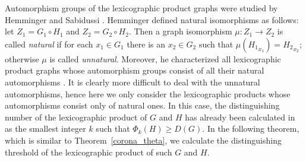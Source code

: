 \documentclass[12pt,a4paper, longbibliography]{article}
\theoremstyle{definition}
\numberwithin{equation}{section}
\begin{document}
	
	Automorphism groups of the lexicographic product graphs were studied by Hemminger \cite{heminger1968} and Sabidussi \cite{Sabidussi1961}.  Hemminger defined natural isomorphisms as follows: let $Z_1 = G_1 \circ H_1$ and $Z_2 =G_2 \circ H_2$. Then a graph isomorphism $\mu: Z_1\rightarrow Z_2$ is called \emph{natural} if for each $x_1 \in G_1$ there is an $x_2 \in G_2$ such that $\mu({H_1}_{x_1})= {H_2}_{x_2}$; otherwise $\mu$ is called \textit{unnatural}. Moreover, he characterized all lexicographic product graphs whose automorphism groups consist  of all their natural automorphisms \cite{heminger1968}. It is clearly  more difficult  to deal with the  unnatural automorphisms, hence here we only consider the lexicographic products whose automorphisms consist only of natural ones.
	In this case, the distinguishing number of the lexicographic product of $G$ and $H$ has already been calculated in~\cite{ahmadi2020number} as the smallest integer $k$ such that $\Phi_k (H)\geq D(G)$. In the following theorem, which is similar to Theorem~\ref{corona_theta}, we calculate the distinguishing threshold of the lexicographic product of such $G$ and $H$. 
	
\end{document}
